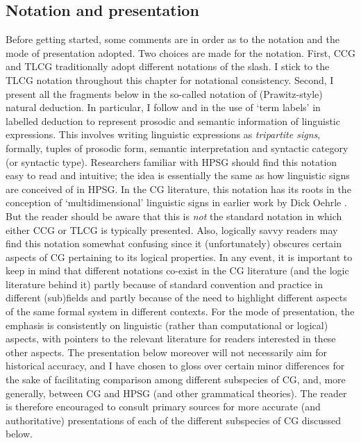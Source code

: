 \documentclass[output=paper]{langsci/langscibook}
\begin{document}
\subsection{Notation and presentation }

Before getting started, some comments are in order as to the notation
and the mode of presentation adopted. Two choices are made for the notation.
First, CCG and TLCG traditionally adopt different notations of the
slash. I stick to the TLCG notation throughout this chapter for
notational consistency. Second, I present all the fragments below in
the so-called  notation of (Prawitz-style) natural
deduction. In particular, I follow \citet{oehrle1994} and \citet{Morrill94a-u} in
the use of `term labels' in labelled deduction to represent prosodic
and semantic information of linguistic expressions. This involves
writing linguistic expressions as \emph{tripartite signs}, formally, tuples
of prosodic form, semantic interpretation and syntactic category (or
syntactic type). Researchers familiar with
HPSG should find this notation easy to read and
intuitive; the idea is essentially the same as how
linguistic signs are conceived of in HPSG. In the CG literature, this
notation has its roots in the conception of `multidimensional'
linguistic signs in earlier work by Dick Oehrle \citep{oehrle88}. But the
reader should be aware that this is \emph{not} the standard notation in
which either CCG or TLCG is typically presented. Also, logically savvy
readers may find this notation somewhat confusing since it
(unfortunately) obscures certain aspects of CG pertaining to its
logical properties. In any event, it is important to keep in mind that
different notations co-exist in the CG literature (and the logic
literature behind it) partly because of standard convention and
practice in different (sub)fields and partly because of the need to
highlight different aspects of the same formal system in different
contexts. For the mode of presentation, the emphasis is consistently
on linguistic (rather than computational or logical) aspects, with
pointers to the relevant literature for readers interested in these
other aspects. The presentation below moreover will not necessarily
aim for historical accuracy, and I have chosen to gloss over certain minor
differences for the sake of facilitating comparison among 
different subspecies of CG, and, more generally, between CG and HPSG
(and other grammatical theories). The reader is therefore encouraged to
consult primary sources for more accurate (and authoritative) presentations of
each of the different subspecies of CG discussed below.
\end{document}
